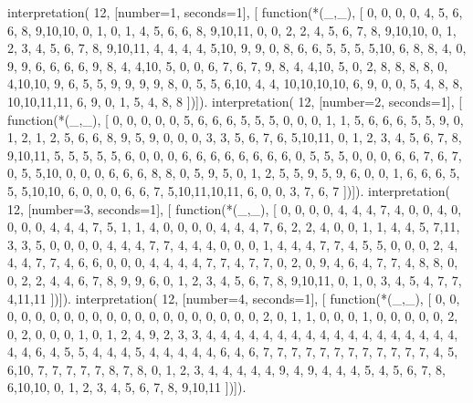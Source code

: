 interpretation( 12, [number=1, seconds=1], [
  function(*(_,_), [
     0, 0, 0, 0, 4, 5, 6, 6, 8, 9,10,10,
     0, 1, 0, 1, 4, 5, 6, 6, 8, 9,10,11,
     0, 0, 2, 2, 4, 5, 6, 7, 8, 9,10,10,
     0, 1, 2, 3, 4, 5, 6, 7, 8, 9,10,11,
     4, 4, 4, 4, 5,10, 9, 9, 0, 8, 6, 6,
     5, 5, 5, 5,10, 6, 8, 8, 4, 0, 9, 9,
     6, 6, 6, 6, 9, 8, 4, 4,10, 5, 0, 0,
     6, 7, 6, 7, 9, 8, 4, 4,10, 5, 0, 2,
     8, 8, 8, 8, 0, 4,10,10, 9, 6, 5, 5,
     9, 9, 9, 9, 8, 0, 5, 5, 6,10, 4, 4,
    10,10,10,10, 6, 9, 0, 0, 5, 4, 8, 8,
    10,10,11,11, 6, 9, 0, 1, 5, 4, 8, 8 ])]).
interpretation( 12, [number=2, seconds=1], [
  function(*(_,_), [
     0, 0, 0, 0, 0, 5, 6, 6, 6, 5, 5, 5,
     0, 0, 0, 1, 1, 5, 6, 6, 6, 5, 5, 9,
     0, 1, 2, 1, 2, 5, 6, 6, 8, 9, 5, 9,
     0, 0, 0, 3, 3, 5, 6, 7, 6, 5,10,11,
     0, 1, 2, 3, 4, 5, 6, 7, 8, 9,10,11,
     5, 5, 5, 5, 5, 6, 0, 0, 0, 6, 6, 6,
     6, 6, 6, 6, 6, 0, 5, 5, 5, 0, 0, 0,
     6, 6, 7, 6, 7, 0, 5, 5,10, 0, 0, 0,
     6, 6, 6, 8, 8, 0, 5, 9, 5, 0, 1, 2,
     5, 5, 9, 5, 9, 6, 0, 0, 1, 6, 6, 6,
     5, 5, 5,10,10, 6, 0, 0, 0, 6, 6, 7,
     5,10,11,10,11, 6, 0, 0, 3, 7, 6, 7 ])]).
interpretation( 12, [number=3, seconds=1], [
  function(*(_,_), [
     0, 0, 0, 0, 4, 4, 4, 7, 4, 0, 0, 4,
     0, 0, 0, 0, 4, 4, 4, 7, 5, 1, 1, 4,
     0, 0, 0, 0, 4, 4, 4, 7, 6, 2, 2, 4,
     0, 0, 1, 1, 4, 4, 5, 7,11, 3, 3, 5,
     0, 0, 0, 0, 4, 4, 4, 7, 7, 4, 4, 4,
     0, 0, 0, 1, 4, 4, 4, 7, 7, 4, 5, 5,
     0, 0, 0, 2, 4, 4, 4, 7, 7, 4, 6, 6,
     0, 0, 0, 4, 4, 4, 4, 7, 7, 4, 7, 7,
     0, 2, 0, 9, 4, 6, 4, 7, 7, 4, 8, 8,
     0, 0, 2, 2, 4, 4, 6, 7, 8, 9, 9, 6,
     0, 1, 2, 3, 4, 5, 6, 7, 8, 9,10,11,
     0, 1, 0, 3, 4, 5, 4, 7, 7, 4,11,11 ])]).
interpretation( 12, [number=4, seconds=1], [
  function(*(_,_), [
     0, 0, 0, 0, 0, 0, 0, 0, 0, 0, 0, 0,
     0, 0, 0, 0, 0, 0, 0, 0, 2, 0, 1, 1,
     0, 0, 0, 1, 0, 0, 0, 0, 0, 2, 0, 2,
     0, 0, 0, 1, 0, 1, 2, 4, 9, 2, 3, 3,
     4, 4, 4, 4, 4, 4, 4, 4, 4, 4, 4, 4,
     4, 4, 4, 4, 4, 4, 4, 4, 6, 4, 5, 5,
     4, 4, 4, 5, 4, 4, 4, 4, 4, 6, 4, 6,
     7, 7, 7, 7, 7, 7, 7, 7, 7, 7, 7, 7,
     4, 5, 6,10, 7, 7, 7, 7, 7, 8, 7, 8,
     0, 1, 2, 3, 4, 4, 4, 4, 4, 9, 4, 9,
     4, 4, 4, 5, 4, 5, 6, 7, 8, 6,10,10,
     0, 1, 2, 3, 4, 5, 6, 7, 8, 9,10,11 ])]).
